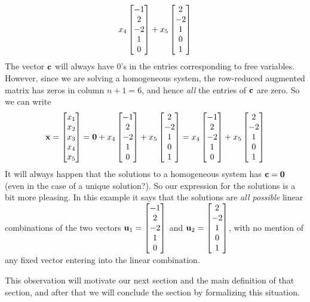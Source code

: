 \documentclass{ximera}
\begin{document}
\begin{example}
\begin{align*}
    x_4\begin{bmatrix}-1\\2\\-2\\1\\0\end{bmatrix}+
    x_5\begin{bmatrix}2\\-2\\1\\0\\1\end{bmatrix}
  \end{align*}
  The vector $\mathbf{c}$ will always have 0's in the entries
  corresponding to free variables.  However, since we are solving a
  homogeneous system, the row-reduced augmented matrix has zeros in
  column $n+1=6$, and hence \textit{all} the entries of $\mathbf{c}$ are
  zero.  So we can write
  \[
    \mathbf{x}=\begin{bmatrix}x_1\\x_2\\x_3\\x_4\\x_5\end{bmatrix}=
    \mathbf{0}+
    x_4\begin{bmatrix}-1\\2\\-2\\1\\0\end{bmatrix}+
    x_5\begin{bmatrix}2\\-2\\1\\0\\1\end{bmatrix}
    =
    x_4\begin{bmatrix}-1\\2\\-2\\1\\0\end{bmatrix}+
    x_5\begin{bmatrix}2\\-2\\1\\0\\1\end{bmatrix}
  \]
  It will always happen that the solutions to a homogeneous system has
  $\mathbf{c}=\mathbf{0}$ (even in the case of a unique solution?).  So
  our expression for the solutions is a bit more pleasing.  In this
  example it says that the solutions are \textit{all possible} linear
  combinations of the two vectors
  $\mathbf{u}_1=\begin{bmatrix}-1\\2\\-2\\1\\0\end{bmatrix}$ and
  $\mathbf{u}_2=\begin{bmatrix}2\\-2\\1\\0\\1\end{bmatrix}$, with no mention of any
  fixed vector entering into the linear combination.

  This observation will motivate our next section and the main
  definition of that section, and after that we will conclude the
  section by formalizing this situation.
\end{example}
\end{document}
